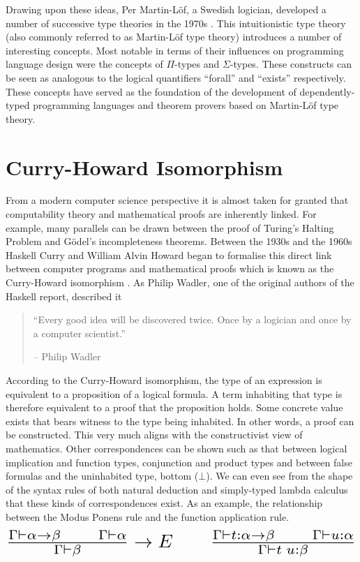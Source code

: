 \documentclass[a4paper, notitlepage]{report}
\begin{document}
Drawing upon these ideas, Per Martin-Löf, a Swedish logician, developed a number
of successive type theories in the 1970s \cite{martin-lof_intuitionistic_1984}.
This intuitionistic type theory (also commonly referred to as Martin-Löf type
theory) introduces a number of interesting concepts. Most notable in terms of
their influences on programming language design were the concepts of \(\Pi\)-types
and \(\Sigma\)-types. These constructs can be seen as analogous to the logical
quantifiers ``forall'' and ``exists'' respectively. These concepts have served
as the foundation of the development of dependently-typed programming languages
and theorem provers based on Martin-Löf type theory.

\section{Curry-Howard Isomorphism}
\label{sec:org1736c8e}
From a modern computer science perspective it is almost taken for granted that
computability theory and mathematical proofs are inherently linked. For example,
many parallels can be drawn between the proof of Turing's Halting Problem and
Gödel's incompleteness theorems. Between the 1930s and the 1960s Haskell Curry
and William Alvin Howard began to formalise this direct link between computer
programs and mathematical proofs which is known as the Curry-Howard isomorphism
\cite{mcadams_tutor_2013}. As Philip Wadler, one of the original authors of the
Haskell report, described it \cite{strange_loop_2015,wadler_propos_2015}

\begin{quote}
``Every good idea will be discovered twice. Once by a logician and once by a
computer scientist.''

\hfill-- Philip Wadler
\end{quote}

According to the Curry-Howard isomorphism, the type of an expression is
equivalent to a proposition of a logical formula. A term inhabiting that type is
therefore equivalent to a proof that the proposition holds. Some concrete value
exists that bears witness to the type being inhabited. In other words, a proof
can be constructed. This very much aligns with the constructivist view of
mathematics. Other correspondences can be shown such as that between logical
implication and function types, conjunction and product types and between false
formulas and the uninhabited type, bottom (\(\bot\)). We can even see from the
shape of the syntax rules of both natural deduction and simply-typed lambda
calculus that these kinds of correspondences exist. As an example, the
relationship between the Modus Ponens rule and the function application rule.
\[ \scalebox{2}{$\frac{\Gamma \vdash \alpha \rightarrow \beta \qquad \Gamma
\vdash \alpha}{\Gamma \vdash \beta} \rightarrow E \qquad \frac{\Gamma \vdash
t:\alpha \rightarrow \beta \qquad \Gamma \vdash u:\alpha}{\Gamma \vdash
t\;u:\beta}$} \]
\end{document}
